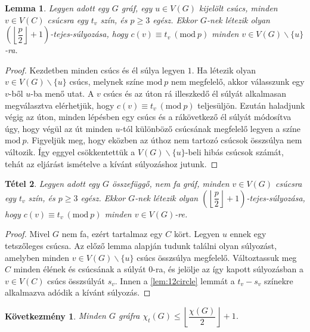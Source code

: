 \documentclass[12pt, a4paper]{report}
\newtheorem{tét}{Tétel}[section]
\newtheorem{lem}[tét]{Lemma}
\newtheorem*{köv}{Következmény}
\theoremstyle{remark}
\theoremstyle{definition}
\begin{document}
\begin{lem}
Legyen adott egy $G$ gráf, egy $u \in V(G)$ kijelölt csúcs, minden $v \in V(C)$ csúcsra egy $t_v$ szín, és $p \geq 3$ egész. Ekkor $G$-nek létezik olyan $\left( \left\lfloor \dfrac{p}{2} \right\rfloor + 1 \right)$-tejes-súlyozása, hogy $c(v) ≡ t_v\ (\mathrm{mod}\ p)$ minden $v \in V(G) \smallsetminus \lbrace u \rbrace$-ra.
\end{lem}

\begin{proof}
Kezdetben minden csúcs és él súlya legyen $1$. Ha létezik olyan $v \in V(G) \smallsetminus \lbrace u \rbrace$ csúcs, melynek színe $\mathrm{mod}\ p$ nem megfelelő, akkor válasszunk egy $v$-ből $u$-ba menő utat. A $v$ csúcs és az úton rá illeszkedő él súlyát alkalmasan megválasztva elérhetjük, hogy $c(v) ≡ t_v\ (\mathrm{mod}\ p)$ teljesüljön. Ezután haladjunk végig az úton, minden lépésben egy csúcs és a rákövetkező él súlyát módosítva úgy, hogy végül az út minden $u$-tól különböző csúcsának megfelelő legyen a színe $\mathrm{mod}\ p$. Figyeljük meg, hogy eközben az úthoz nem tartozó csúcsok összsúlya nem változik. Így eggyel csökkentettük a $V(G) \smallsetminus \lbrace u \rbrace$-beli hibás csúcsok számát, tehát az eljárást ismételve a kívánt súlyozáshoz jutunk.
\end{proof}

\begin{tét}
Legyen adott egy $G$ összefüggő, nem fa gráf, minden $v \in V(G)$ csúcsra egy $t_v$ szín, és $p \geq 3$ egész. Ekkor $G$-nek létezik olyan $\left( \left\lfloor \dfrac{p}{2} \right\rfloor + 1 \right)$-tejes-súlyozása, hogy $c(v) ≡ t_v\ (\mathrm{mod}\ p)$ minden $v \in V(G)$-re.
\end{tét}

\begin{proof}
Mivel $G$ nem fa, ezért tartalmaz egy $C$ kört. Legyen $u$ ennek egy tetszőleges csúcsa. Az előző lemma alapján tudunk találni olyan súlyozást, amelyben minden $v \in V(G) \smallsetminus \lbrace u \rbrace$ csúcs összsúlya megfelelő. Változtassuk meg $C$ minden élének és csúcsának a súlyát $0$-ra, és jelölje az így kapott súlyozásban a $v \in V(C)$ csúcs összsúlyát $s_v$. Innen a \ref{lem:12circle} lemmát a $t_v - s_v$ színekre alkalmazva adódik a kívánt súlyozás.
\end{proof}

\begin{köv}
Minden $G$ gráfra $\chi_t(G) \leq \left\lfloor \dfrac{\chi(G)}{2} \right\rfloor + 1$.
\end{köv}
\end{document}
